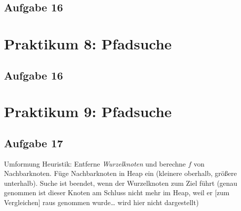 \documentclass{scrreprt}
\begin{document}
\section{Aufgabe 16}


\chapter{Praktikum 8: Pfadsuche}
\section{Aufgabe 16}

\chapter{Praktikum 9: Pfadsuche}
\section{Aufgabe 17}
Umformung Heuristik: Entferne \emph{Wurzelknoten} und berechne $f$ von Nachbarknoten. Füge Nachbarknoten in Heap ein (kleinere oberhalb, größere unterhalb). Suche ist beendet, wenn der Wurzelknoten zum Ziel führt (genau genommen ist dieser Knoten am Schluss nicht mehr im Heap, weil er [zum Vergleichen] raus genommen wurde… wird hier nicht dargestellt)
\end{document}
